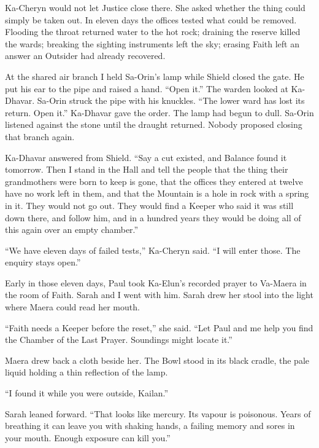 Ka-Cheryn would not let Justice close there. She asked whether the thing could simply be taken out. In eleven days the offices tested what could be removed. Flooding the throat returned water to the hot rock; draining the reserve killed the wards; breaking the sighting instruments left the sky; erasing Faith left an answer an Outsider had already recovered.\par

At the shared air branch I held Sa-Orin's lamp while Shield closed the gate. He put his ear to the pipe and raised a hand. ``Open it.'' The warden looked at Ka-Dhavar. Sa-Orin struck the pipe with his knuckles. ``The lower ward has lost its return. Open it.'' Ka-Dhavar gave the order. The lamp had begun to dull. Sa-Orin listened against the stone until the draught returned. Nobody proposed closing that branch again.\par

Ka-Dhavar answered from Shield. ``Say a cut existed, and Balance found it tomorrow. Then I stand in the Hall and tell the people that the thing their grandmothers were born to keep is gone, that the offices they entered at twelve have no work left in them, and that the Mountain is a hole in rock with a spring in it. They would not go out. They would find a Keeper who said it was still down there, and follow him, and in a hundred years they would be doing all of this again over an empty chamber.''\par

``We have eleven days of failed tests,'' Ka-Cheryn said. ``I will enter those. The enquiry stays open.''\par

Early in those eleven days, Paul took Ka-Elun's recorded prayer to Va-Maera in the room of Faith. Sarah and I went with him. Sarah drew her stool into the light where Maera could read her mouth.\par

``Faith needs a Keeper before the reset,'' she said. ``Let Paul and me help you find the Chamber of the Last Prayer. Soundings might locate it.''\par

Maera drew back a cloth beside her. The Bowl stood in its black cradle, the pale liquid holding a thin reflection of the lamp.\par

``I found it while you were outside, Kailan.''\par

Sarah leaned forward. ``That looks like mercury. Its vapour is poisonous. Years of breathing it can leave you with shaking hands, a failing memory and sores in your mouth. Enough exposure can kill you.''\par

